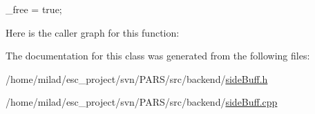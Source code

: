 \begin{DoxyCode}
                       {
        _free = true;
}
\end{DoxyCode}


Here is the caller graph for this function:




The documentation for this class was generated from the following files:\begin{DoxyCompactItemize}
\item 
/home/milad/esc\_\-project/svn/PARS/src/backend/\hyperlink{sideBuff_8h}{sideBuff.h}\item 
/home/milad/esc\_\-project/svn/PARS/src/backend/\hyperlink{sideBuff_8cpp}{sideBuff.cpp}\end{DoxyCompactItemize}
